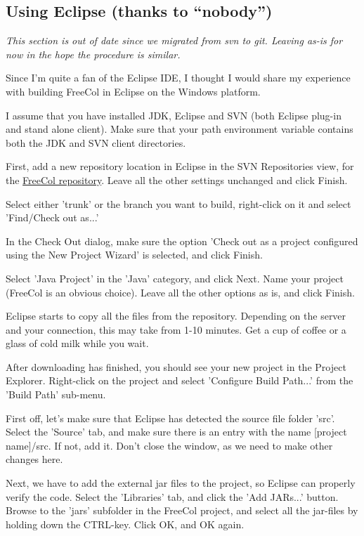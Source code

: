 \documentclass[12pt]{book}
\begin{document}
\hypertarget{Using Eclipse}{\subsection{Using Eclipse (thanks to ``nobody'')}}

\emph{This section is out of date since we migrated from svn to git.
Leaving as-is for now in the hope the procedure is similar.}

Since I'm quite a fan of the Eclipse IDE, I thought I would share my
experience with building FreeCol in Eclipse on the Windows platform.

I assume that you have installed JDK, Eclipse and SVN (both Eclipse
plug-in and stand alone client). Make sure that your path environment
variable contains both the JDK and SVN client directories.

First, add a new repository location in Eclipse in the SVN
Repositories view, for the
\href{https://svn.freecol.org/svnroot/freecol/freecol/}{FreeCol
  repository}. Leave all the other settings unchanged and click
Finish.

Select either 'trunk' or the branch you want to build, right-click on
it and select 'Find/Check out as...'

In the Check Out dialog, make sure the option 'Check out as a project
configured using the New Project Wizard' is selected, and click
Finish.

Select 'Java Project' in the 'Java' category, and click Next. Name
your project (FreeCol is an obvious choice). Leave all the other
options as is, and click Finish.

Eclipse starts to copy all the files from the repository. Depending on
the server and your connection, this may take from 1-10 minutes. Get a
cup of coffee or a glass of cold milk while you wait.

After downloading has finished, you should see your new project in the
Project Explorer. Right-click on the project and select 'Configure
Build Path...' from the 'Build Path' sub-menu.

First off, let's make sure that Eclipse has detected the source file
folder 'src'. Select the 'Source' tab, and make sure there is an entry
with the name [project name]/src. If not, add it. Don't close the
window, as we need to make other changes here.

Next, we have to add the external jar files to the project, so Eclipse
can properly verify the code. Select the 'Libraries' tab, and click
the 'Add JARs...' button. Browse to the 'jars' subfolder in the
FreeCol project, and select all the jar-files by holding down the
CTRL-key. Click OK, and OK again.
\end{document}
